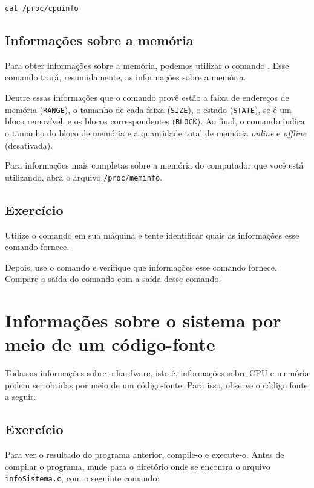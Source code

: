 \begin{lstlisting}[style=MyBashStyle]
cat /proc/cpuinfo
\end{lstlisting}


\subsection{Informações sobre a memória}
Para obter informações sobre a memória, podemos utilizar o comando . Esse comando trará, resumidamente, as informações sobre a memória. 

Dentre essas informações que o comando  provê estão a faixa de endereços de memória (\texttt{RANGE}), o tamanho de cada faixa (\texttt{SIZE}), o estado (\texttt{STATE}), se é um bloco removível, e os blocos correspondentes (\texttt{BLOCK}). Ao final, o comando indica o tamanho do bloco de memória e a quantidade total de memória \textit{online} e \textit{offline} (desativada).

Para informações mais completas sobre a memória do computador que você está utilizando, abra o arquivo \texttt{/proc/meminfo}.

\subsection{Exercício}
Utilize o comando  em sua máquina e tente identificar quais as informações esse comando fornece.

Depois, use o comando  e verifique que informações esse comando fornece. Compare a saída do comando  com a saída desse comando.


\section{Informações sobre o sistema por meio de um código-fonte}
Todas as informações sobre o hardware, isto é, informações sobre CPU e memória podem ser obtidas por meio de um código-fonte. Para isso, observe o código fonte a seguir.

\clearpage


\subsection{Exercício}
Para ver o resultado do programa anterior, compile-o e execute-o. Antes de compilar o programa, mude para o diretório onde se encontra o arquivo  \texttt{infoSistema.c}, com o seguinte comando:

